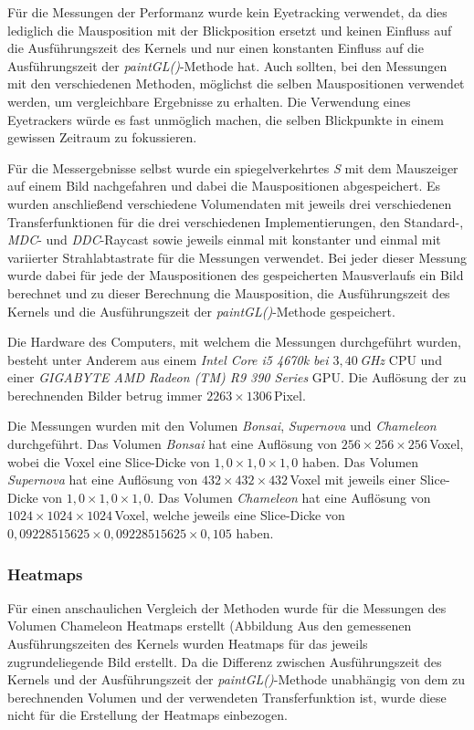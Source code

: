 Für die Messungen der Performanz wurde kein Eyetracking verwendet, da dies lediglich die Mausposition mit der Blickposition ersetzt und keinen Einfluss auf die Ausführungszeit des Kernels und nur einen konstanten Einfluss auf die Ausführungszeit der \emph{paintGL()}-Methode hat.
Auch sollten, bei den Messungen mit den verschiedenen Methoden, möglichst die selben Mauspositionen verwendet werden, um vergleichbare Ergebnisse zu erhalten.
Die Verwendung eines Eyetrackers würde es fast unmöglich machen, die selben Blickpunkte in einem gewissen Zeitraum zu fokussieren.

Für die Messergebnisse selbst wurde ein spiegelverkehrtes \emph{S} mit dem Mauszeiger auf einem Bild nachgefahren und dabei die Mauspositionen abgespeichert.
Es wurden anschließend verschiedene Volumendaten mit jeweils drei verschiedenen Transferfunktionen für die drei verschiedenen Implementierungen, den Standard-, \emph{MDC}- und \emph{DDC}-Raycast sowie jeweils einmal mit konstanter und einmal mit variierter Strahlabtastrate für die Messungen verwendet.
Bei jeder dieser Messung wurde dabei für jede der Mauspositionen des gespeicherten Mausverlaufs ein Bild berechnet und zu dieser Berechnung die Mausposition, die Ausführungszeit des Kernels und die Ausführungszeit der \emph{paintGL()}-Methode gespeichert.

Die Hardware des Computers, mit welchem die Messungen durchgeführt wurden, besteht unter Anderem aus einem \emph{Intel Core i5 4670k bei $3,40$\,GHz} CPU und einer \emph{GIGABYTE AMD Radeon (TM) R9 390 Series} GPU.
Die Auflösung der zu berechnenden Bilder betrug immer $2263\times1306$\,Pixel.

Die Messungen wurden mit den Volumen \emph{Bonsai}, \emph{Supernova} und \emph{Chameleon} durchgeführt.
Das Volumen \emph{Bonsai} hat eine Auflösung von $256\times256\times256$\,Voxel, wobei die Voxel eine Slice-Dicke von $1,0\times1,0\times1,0$ haben.
Das Volumen \emph{Supernova} hat eine Auflösung von $432\times432\times432$\,Voxel mit jeweils einer Slice-Dicke von $1,0\times1,0\times1,0$.
Das Volumen \emph{Chameleon} hat eine Auflösung von $1024\times1024\times1024$\,Voxel, welche jeweils eine Slice-Dicke von $0,09228515625\times0,09228515625\times0,105$ haben.

\subsubsection{Heatmaps}

Für einen anschaulichen Vergleich der Methoden wurde für die Messungen des Volumen Chameleon Heatmaps erstellt (Abbildung 
Aus den gemessenen Ausführungszeiten des Kernels wurden Heatmaps für das jeweils zugrundeliegende Bild erstellt.
Da die Differenz zwischen Ausführungszeit des Kernels und der Ausführungszeit der \emph{paintGL()}-Methode unabhängig von dem zu berechnenden Volumen und der verwendeten Transferfunktion ist, wurde diese nicht für die Erstellung der Heatmaps einbezogen.


